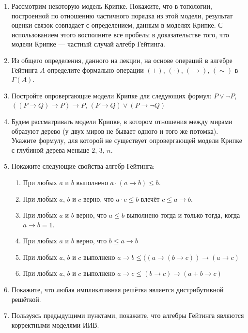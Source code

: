 \documentclass[10pt,a4paper,oneside]{article}
\begin{document}
\begin{enumerate}
\item Рассмотрим некоторую модель Крипке. Покажите, что в топологии, построенной по 
отношению частичного порядка из этой модели, результат оценки связок совпадает с определением, 
данным в моделях Крипке. С использованием этого восполните все пробелы в доказательстве 
того, что модели Крипке --- частный случай алгебр Гейтинга.
\item Из общего определения, данного на лекции, на основе операций в алгебре Гейтинга $A$ 
определите формально операции $(+)$, $(\cdot)$, $(\rightarrow)$, $(\sim)$ в $\Gamma(A)$.
\item Постройте опровергающие модели Крипке для следующих формул:
$P\vee\neg P$, $((P\rightarrow Q)\rightarrow P)\rightarrow P$, 
$(P\rightarrow Q)\vee(P\rightarrow\neg Q)$
\item Будем рассматривать модели Крипке, в котором отношения между мирами образуют дерево
(у двух миров не бывает одного и того же потомка). Укажите формулу, для которой не 
существует опровергающей модели Крипке с глубиной дерева меньше $2$, $3$, $n$.
\item Покажите следующие свойства алгебр Гейтинга:
\begin{enumerate}
\item При любых $a$ и $b$ выполнено $a\cdot (a\rightarrow b) \le b$.
\item При любых $a$, $b$ и $c$ верно, что $a\cdot c \le b$ влечёт $c \le a \rightarrow b$.
\item При любых $a$ и $b$ верно, что $a \le b$ выполнено тогда и только тогда, когда $a \rightarrow b = 1$.
\item При любых $a$ и $b$ верно, что $b \le a \rightarrow b$
\item При любых $a$, $b$ и $c$ выполнено $a\rightarrow b \le ((a\rightarrow (b \rightarrow c)) \rightarrow (a\rightarrow c)$
\item При любых $a$, $b$ и $c$ выполнено $a\rightarrow c \le (b\rightarrow c) \rightarrow (a+b \rightarrow c)$
\end{enumerate}
\item Покажите, что любая импликативная решётка является дистрибутивной решёткой.
\item Пользуясь предыдущими пунктами, покажите, что алгебры Гейтинга являются 
корректными моделями ИИВ.
\end{enumerate}
\end{document}
